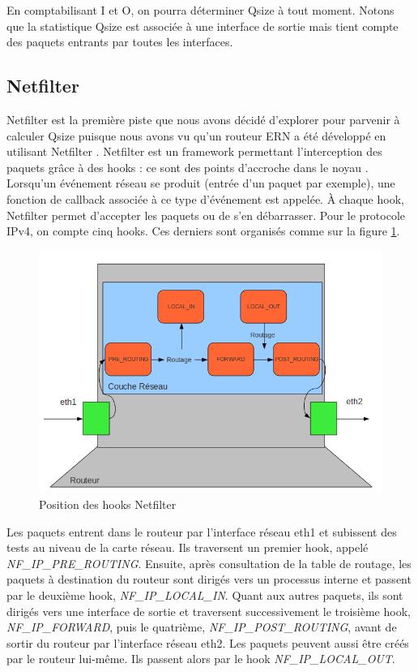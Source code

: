 \documentclass[a4paper]{article}
\begin{document}
En comptabilisant I et O,
on pourra déterminer Qsize à tout moment.
Notons que la statistique Qsize est associée à une interface de sortie mais tient compte des paquets entrants par toutes les interfaces.

\subsection{Netfilter}
Netfilter est la première piste que nous avons décidé d'explorer pour 
parvenir à calculer Qsize puisque nous avons vu qu'un routeur ERN a été développé en utilisant Netfilter \cite{stanford}.
Netfilter est un framework permettant l'interception des paquets
grâce à des hooks : ce sont des points d'accroche dans le noyau \cite{netfilter1}.
Lorsqu'un événement réseau se produit (entrée d'un paquet par exemple),
une fonction de callback associée à ce type d'événement est appelée.
\`A chaque hook, Netfilter permet d'accepter les paquets ou de s'en
débarrasser. Pour le protocole IPv4, on compte cinq hooks. Ces derniers
sont organisés comme sur la figure \ref{hooks}.

\begin{figure}[!ht]
	\centering
	\includegraphics[scale=.5]{hooks.png}
	\caption{\label{hooks} Position des hooks Netfilter}
\end{figure}

Les paquets entrent dans le routeur par l'interface réseau eth1 et subissent des tests au niveau de la carte réseau. Ils traversent un premier 
hook, appelé \textit{NF\_IP\_PRE\_ROUTING}. Ensuite, après consultation de la table 
de routage, les paquets à destination du routeur sont dirigés vers un 
processus interne et passent par le deuxième hook, \textit{NF\_IP\_LOCAL\_IN}. 
Quant aux autres paquets, ils sont dirigés vers une interface de sortie 
et traversent successivement le troisième hook, \textit{NF\_IP\_FORWARD}, puis le 
quatrième, \textit{NF\_IP\_POST\_ROUTING}, avant de sortir du routeur par l'interface réseau eth2. Les paquets 
peuvent aussi être créés par le routeur lui-même. Ils passent alors 
par le hook \textit{NF\_IP\_LOCAL\_OUT}.
\end{document}
